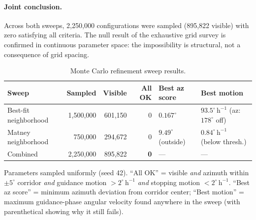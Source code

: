 \documentclass[11pt,a4paper]{article}
\begin{document}
\paragraph{Joint conclusion.}
Across both sweeps, 2,250,000 configurations were sampled
(895,822 visible) with zero satisfying all criteria.
The null result of the exhaustive grid survey is confirmed in continuous
parameter space: the impossibility is structural, not a consequence of
grid spacing.

\begin{table}[h]
  \caption{Monte Carlo refinement sweep results.}
  \label{tab:mc_refined}
  \centering
  \small
  \begin{tabular}{@{}lrrrp{2.8cm}p{3.2cm}@{}}
    \toprule
    Sweep & Sampled & Visible & All OK & Best az score & Best motion \\
    \midrule
    Best-fit neighborhood & 1,500,000 & 601,150 & 0 & $0.167^\circ$ & $93.5^\circ\,\mathrm{h}^{-1}$ (az: $178^\circ$ off)\\
    Matney neighborhood   &   750,000 & 294,672 & 0 & $9.49^\circ$ (outside) & $0.84^\circ\,\mathrm{h}^{-1}$ (below thresh.) \\
    \midrule
    Combined & 2,250,000 & 895,822 & \textbf{0} & --- & --- \\
    \bottomrule
  \end{tabular}

  \smallskip
  {\small Parameters sampled uniformly (seed 42).
  ``All OK'' = visible \emph{and} azimuth within $\pm5^\circ$ corridor
  \emph{and} guidance motion $>2^\circ\,\mathrm{h}^{-1}$
  \emph{and} stopping motion $<2^\circ\,\mathrm{h}^{-1}$.
  ``Best az score'' = minimum azimuth deviation from corridor center;
  ``Best motion'' = maximum guidance-phase angular velocity found anywhere
  in the sweep (with parenthetical showing why it still fails).}
\end{table}
\end{document}
